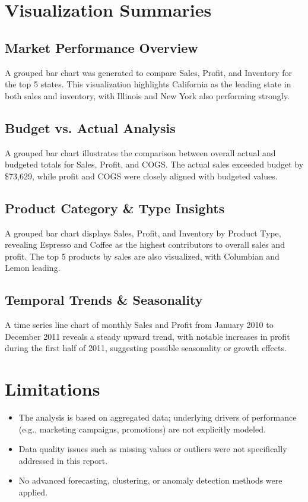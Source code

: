 \documentclass[11pt]{article}
\begin{document}
\section{Visualization Summaries}

\subsection{Market Performance Overview}
A grouped bar chart was generated to compare Sales, Profit, and Inventory for the top 5 states. This visualization highlights California as the leading state in both sales and inventory, with Illinois and New York also performing strongly.

\subsection{Budget vs. Actual Analysis}
A grouped bar chart illustrates the comparison between overall actual and budgeted totals for Sales, Profit, and COGS. The actual sales exceeded budget by \$73,629, while profit and COGS were closely aligned with budgeted values.

\subsection{Product Category \& Type Insights}
A grouped bar chart displays Sales, Profit, and Inventory by Product Type, revealing Espresso and Coffee as the highest contributors to overall sales and profit. The top 5 products by sales are also visualized, with Columbian and Lemon leading.

\subsection{Temporal Trends \& Seasonality}
A time series line chart of monthly Sales and Profit from January 2010 to December 2011 reveals a steady upward trend, with notable increases in profit during the first half of 2011, suggesting possible seasonality or growth effects.

\section{Limitations}
\begin{itemize}
    \item The analysis is based on aggregated data; underlying drivers of performance (e.g., marketing campaigns, promotions) are not explicitly modeled.
    \item Data quality issues such as missing values or outliers were not specifically addressed in this report.
    \item No advanced forecasting, clustering, or anomaly detection methods were applied.
\end{itemize}
\end{document}
